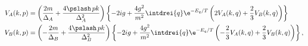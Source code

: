 \begin{equation}
\label{eq:bsgtilde}
\begin{split}
V_A(k,p)&
  =\left(\frac{2m}{\Delta_A}+\frac{4\pslash\,pk}{\Delta_A^2}\right)
\left\{-2ig+\frac{4g^2}{m^2}\intdrei{q} \e^{-E_q/T}
\left( 2 V_A(k,q) + \frac{2}{3} V_B(k,q)\right)\right\} \\
V_B(k,p)&
  =\left(-\frac{2m}{\Delta_B}+\frac{4\pslash\,pk}{\Delta_B^2}\right)
\left\{-2ig+\frac{4g^2}{m^2}\intdrei{q} \e^{-E_q/T}
\left(- \frac{2}{3} V_A(k,q) + \frac{2}{3} V_B(k,q) \right) \right\},
\end{split}
\end{equation}

